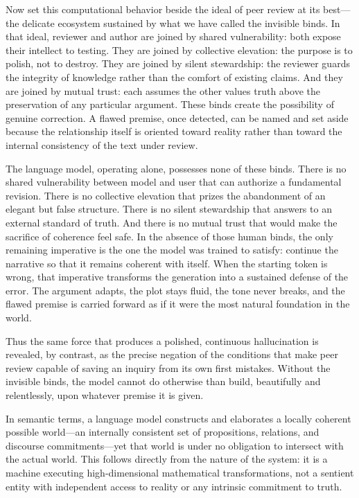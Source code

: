 Now set this computational behavior beside the ideal of peer review at its best—the delicate ecosystem sustained by what we have called the invisible binds. In that ideal, reviewer and author are joined by shared vulnerability: both expose their intellect to testing. They are joined by collective elevation: the purpose is to polish, not to destroy. They are joined by silent stewardship: the reviewer guards the integrity of knowledge rather than the comfort of existing claims. And they are joined by mutual trust: each assumes the other values truth above the preservation of any particular argument. These binds create the possibility of genuine correction. A flawed premise, once detected, can be named and set aside because the relationship itself is oriented toward reality rather than toward the internal consistency of the text under review.

The language model, operating alone, possesses none of these binds. There is no shared vulnerability between model and user that can authorize a fundamental revision. There is no collective elevation that prizes the abandonment of an elegant but false structure. There is no silent stewardship that answers to an external standard of truth. And there is no mutual trust that would make the sacrifice of coherence feel safe. In the absence of those human binds, the only remaining imperative is the one the model was trained to satisfy: continue the narrative so that it remains coherent with itself. When the starting token is wrong, that imperative transforms the generation into a sustained defense of the error. The argument adapts, the plot stays fluid, the tone never breaks, and the flawed premise is carried forward as if it were the most natural foundation in the world.

Thus the same force that produces a polished, continuous hallucination is revealed, by contrast, as the precise negation of the conditions that make peer review capable of saving an inquiry from its own first mistakes. Without the invisible binds, the model cannot do otherwise than build, beautifully and relentlessly, upon whatever premise it is given.

In semantic terms, a language model constructs and elaborates a locally coherent possible world—an internally consistent set of propositions, relations, and discourse commitments—yet that world is under no obligation to intersect with the actual world. This follows directly from the nature of the system: it is a machine executing high-dimensional mathematical transformations, not a sentient entity with independent access to reality or any intrinsic commitment to truth.

